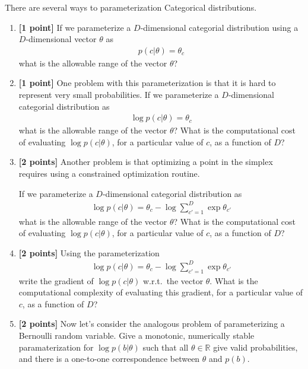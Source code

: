 \documentclass{harvardml}
\theoremstyle{plain}
\begin{document}
\begin{problem}

There are several ways to parameterization Categorical distributions.

\begin{enumerate}[label=(\alph*)]
\item {\bf [1 point]} If we parameterize a $D$-dimensional categorial distribution using a $D$-dimensional vector $\theta$ as
%
\begin{align}
p(c | \theta) = \theta_c
\end{align}
%
what is the allowable range of the vector $\theta$?

\item {\bf [1 point]} One problem with this parameterization is that it is hard to represent very small probabilities.
If we parameterize a $D$-dimensional categorial distribution as
%
\begin{align}
\log p(c | \theta) = \theta_c
\end{align}
%
what is the allowable range of the vector $\theta$?
What is the computational cost of evaluating $\log p(c | \theta)$, for a particular value of $c$, as a function of $D$?

\item {\bf [2 points]} Another problem is that optimizing a point in the simplex requires using a constrained optimization routine.

If we parameterize a $D$-dimensional categorial distribution as
%
\begin{align}
\log p(c | \theta) = \theta_c - \log \sum_{c' = 1}^D \exp \theta_{c'}
\end{align}
%
what is the allowable range of the vector $\theta$? 
What is the computational cost of evaluating $\log p(c | \theta)$, for a particular value of $c$, as a function of $D$?

\item {\bf [2 points]} Using the parameterization
%
\begin{align}
\log p(c | \theta) = \theta_c - \log \sum_{c' = 1}^D \exp \theta_{c'}
\end{align}
%
write the gradient of $\log p(c | \theta)$ w.r.t.\ the vector $\theta$.
What is the computational complexity of evaluating this gradient, for a particular value of $c$, as a function of $D$?

\item {\bf [2 points]} Now let's consider the analogous problem of parameterizing a Bernoulli random variable.
Give a monotonic, numerically stable paramaterization for $\log p(b | \theta)$ such that all $\theta \in \mathbb{R}$ give valid probabilities, and there is a one-to-one correspondence between $\theta$ and $p(b)$.
\end{enumerate}

\end{problem}
\end{document}
